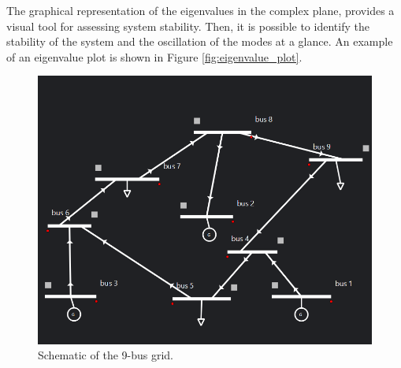 The graphical representation of the eigenvalues in the complex plane, provides a visual tool for assessing system stability. Then, it is possible to identify
the stability of the system and the oscillation of the modes at a glance. An example of an eigenvalue plot is shown in Figure \ref{fig:eigenvalue_plot}.

\begin{figure}[H]
  \centering
  \includegraphics[width= 250 px]{Images/case9_topo.png}
  \caption{Schematic of the 9-bus grid.}
  \label{fig:eigenvalues_plot_example}
\end{figure}


